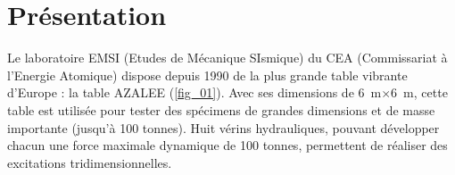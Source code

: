 \documentclass[10pt,fleqn]{article} %
\begin{document}

\vspace{4.5cm}
\pagestyle{fancy}
\thispagestyle{plain}

\def\columnseprulecolor{\color{white}}
\setlength{\columnseprule}{0.4pt} 



\section{Présentation}

Le laboratoire EMSI (Etudes de Mécanique SIsmique) du CEA (Commissariat à l’Energie Atomique) dispose
depuis 1990 de la plus grande table vibrante d’Europe : la table AZALEE (\autoref{fig_01}). Avec ses dimensions de
\SI{6}{m}$\times$\SI{6}{m}, cette table est utilisée pour tester des spécimens de grandes dimensions et de masse importante
(jusqu’à 100 tonnes). Huit vérins hydrauliques, pouvant développer chacun une force maximale dynamique de
100 tonnes, permettent de réaliser des excitations tridimensionnelles.
\end{document}
